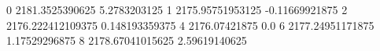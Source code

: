 0 2181.3525390625 5.2783203125
1 2175.95751953125 -0.11669921875
2 2176.222412109375 0.148193359375
4 2176.07421875 0.0
6 2177.24951171875 1.17529296875
8 2178.67041015625 2.59619140625
